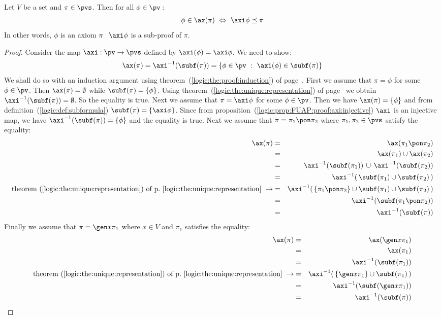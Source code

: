\begin{prop}\label{logic:prop:FUAP:axiomset:charac}
Let $V$ be a set and $\pi\in\pvs$. Then for all $\phi\in\pv$\,:
    \[
    \phi\in\ax(\pi)\ \Leftrightarrow\
    \axi\phi\preceq\pi
    \]
In other words, $\phi$ is an axiom $\pi$ \ifand\ $\axi\phi$ is a
sub-proof of $\pi$.
\end{prop}
\begin{proof}
Consider the map $\axi:\pv\to\pvs$ defined by $\axi(\phi)=\axi\phi$.
We need to show:
    \[
    \ax(\pi)=\axi^{-1}(\subf(\pi))=\{\phi\in\pv\ :\
    \axi(\phi)\in\subf(\pi)\}
    \]
We shall do so with an induction argument using
theorem~(\ref{logic:the:proof:induction}) of
page~\pageref{logic:the:proof:induction}.  First we assume that
$\pi=\phi$ for some $\phi\in\pv$. Then $\ax(\pi)=\emptyset$ while
$\subf(\pi)=\{\phi\}$. Using
theorem~(\ref{logic:the:unique:representation}) of
page~\pageref{logic:the:unique:representation} we obtain
$\axi^{-1}(\subf(\pi))=\emptyset$. So the equality is true. Next we
assume that $\pi=\axi\phi$ for some $\phi\in\pv$. Then we have
$\ax(\pi)=\{\phi\}$ and from definition~(\ref{logic:def:subformula})
$\subf(\pi)=\{\axi\phi\}$. Since from
proposition~(\ref{logic:prop:FUAP:proof:axi:injective}) $\axi$ is an
injective map, we have $\axi^{-1}(\subf(\pi))=\{\phi\}$ and the
equality is true. Next we assume that $\pi=\pi_{1}\pon\pi_{2}$ where
$\pi_{1},\pi_{2}\in\pvs$ satisfy the equality:
    \begin{eqnarray*}
    \ax(\pi)&=&\ax(\pi_{1}\pon\pi_{2})\\
    &=&\ax(\pi_{1})\cup\ax(\pi_{2})\\
    &=&\axi^{-1}(\subf(\pi_{1}))\,\cup\,\axi^{-1}(\subf(\pi_{2}))\\
    &=&\axi^{-1}(\,\subf(\pi_{1})\cup\subf(\pi_{2})\,)\\
    \mbox{theorem~(\ref{logic:the:unique:representation})
    of p.~\pageref{logic:the:unique:representation}}\ \rightarrow
    &=&\axi^{-1}(\,\{\pi_{1}\pon\pi_{2}\}\cup\subf(\pi_{1})\cup\subf(\pi_{2})\,)\\
    &=&\axi^{-1}(\subf(\pi_{1}\pon\pi_{2}))\\
    &=&\axi^{-1}(\subf(\pi))
    \end{eqnarray*}
Finally we assume that $\pi=\gen x\pi_{1}$ where $x\in V$ and
$\pi_{1}$ satisfies the equality:
    \begin{eqnarray*}
    \ax(\pi)&=&\ax(\gen x\pi_{1})\\
    &=&\ax(\pi_{1})\\
    &=&\axi^{-1}(\subf(\pi_{1}))\\
    \mbox{theorem~(\ref{logic:the:unique:representation})
    of p.~\pageref{logic:the:unique:representation}}\ \rightarrow
    &=&\axi^{-1}(\,\{\gen x\pi_{1}\}\cup\subf(\pi_{1})\,)\\
    &=&\axi^{-1}(\subf(\gen x\pi_{1}))\\
    &=&\axi^{-1}(\subf(\pi))
    \end{eqnarray*}
\end{proof}

